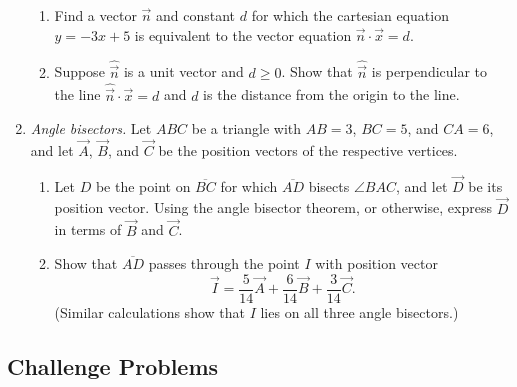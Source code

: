 \begin{enumerate}
\begin{enumerate}
\item Find a vector $\vec{n}$ and constant $d$ for which the cartesian equation $y = -3x + 5$ is equivalent to the vector equation $\vec{n}\cdot\vec{x} = d$.
\item Suppose $\hat{\vec{n}}$ is a unit vector and $d\geq 0$. Show that $\hat{\vec{n}}$ is perpendicular to the line $\hat{\vec{n}}\cdot\vec{x} = d$ and $d$ is the distance from the origin to the line.
\end{enumerate}
\item \emph{Angle bisectors.} Let $ABC$ be a triangle with $AB = 3$, $BC = 5$, and $CA = 6$, and let $\vec{A}$, $\vec{B}$, and $\vec{C}$ be the position vectors of the respective vertices.
\begin{enumerate}
\item Let $D$ be the point on $\overline{BC}$ for which $\overline{AD}$ bisects $\angle BAC$, and let $\vec{D}$ be its position vector. Using the angle bisector theorem, or otherwise, express $\vec{D}$ in terms of $\vec{B}$ and $\vec{C}$.
\item Show that $\overline{AD}$ passes through the point $I$ with position vector
\begin{equation*}
\vec{I} = \frac{5}{14}\vec{A} + \frac{6}{14}\vec{B} + \frac{3}{14}\vec{C}.
\end{equation*}
(Similar calculations show that $I$ lies on all three angle bisectors.)
\end{enumerate}
\end{enumerate}


\subsection{Challenge Problems}

